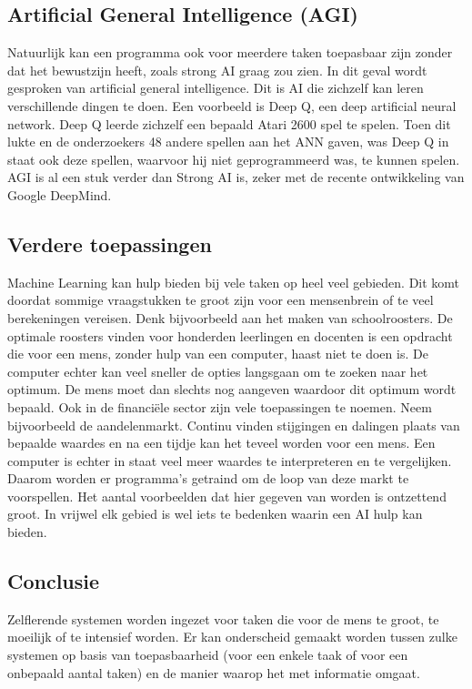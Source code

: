 \subsection{Artificial General Intelligence (AGI)}
Natuurlijk kan een programma ook voor meerdere taken toepasbaar zijn zonder dat het bewustzijn heeft, zoals strong AI graag zou zien. In dit geval wordt gesproken van artificial general intelligence. Dit is AI die zichzelf kan leren verschillende dingen te doen. Een voorbeeld is Deep Q, een deep artificial neural network. Deep Q leerde zichzelf een bepaald Atari 2600 spel te spelen. Toen dit lukte en de onderzoekers 48 andere spellen aan het ANN gaven, was Deep Q in staat ook deze spellen, waarvoor hij niet geprogrammeerd was, te kunnen spelen. \cite{DeepQ}
AGI is al een stuk verder dan Strong AI is, zeker met de recente ontwikkeling van Google DeepMind. \cite{DeepMind1}

\subsection{Verdere toepassingen}
Machine Learning kan hulp bieden bij vele taken op heel veel gebieden. Dit komt doordat sommige vraagstukken te groot zijn voor een mensenbrein of te veel berekeningen vereisen. Denk bijvoorbeeld aan het maken van schoolroosters. De optimale roosters vinden voor honderden leerlingen en docenten is een opdracht die voor een mens, zonder hulp van een computer, haast niet te doen is. De computer echter kan veel sneller de opties langsgaan om te zoeken naar het optimum. De mens moet dan slechts nog aangeven waardoor dit optimum wordt bepaald.
Ook in de financiële sector zijn vele toepassingen te noemen. Neem bijvoorbeeld de aandelenmarkt. Continu vinden stijgingen en dalingen plaats van bepaalde waardes en na een tijdje kan het teveel worden voor een mens. Een computer is echter in staat veel meer waardes te interpreteren en te vergelijken. Daarom worden er programma’s getraind om de loop van deze markt te voorspellen.
Het aantal voorbeelden dat hier gegeven van worden is ontzettend groot. In vrijwel elk gebied is wel iets te bedenken waarin een AI hulp kan bieden.

\subsection{Conclusie}
Zelflerende systemen worden ingezet voor taken die voor de mens te groot, te moeilijk of te intensief worden. Er kan onderscheid gemaakt worden tussen zulke systemen op basis van toepasbaarheid (voor een enkele taak of voor een onbepaald aantal taken) en de manier waarop het met informatie omgaat.